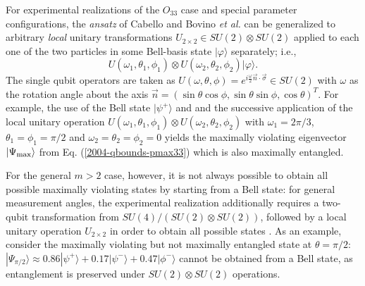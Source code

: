 \documentclass[pra,showpacs,showkeys,amsfonts,amsmath]{revtex4}
\begin{document}
For experimental realizations of the $O_{33}$ case and special parameter configurations,
the {\it ansatz} of Cabello \cite{cabello-2003a} and Bovino {\it et al.} \cite{bovino-2003}
can be generalized to arbitrary {\em local}
unitary transformations $U_{2\times 2} \in SU(2) \otimes SU(2)$ applied to each one of the two particles
in some Bell-basis state $|\varphi \rangle$
separately; i.e.,
\begin{equation}
  U(\omega_1,\theta_1,\phi_1)\otimes U(\omega_2,\theta_2,\phi_2) |\varphi \rangle .
\label{2004-qbounds-gencab}
\end{equation}
The single
qubit operators are taken as $U(\omega,\theta,\phi) =
e^{i\frac{\omega}{2} \vec{n}\cdot\vec{\sigma}} \in SU(2)$ with
$\omega$ as the rotation angle about the axis $\vec{n}=
(\sin\theta\cos\phi,\sin\theta\sin\phi,\cos\theta)^T$.
For example, the use of the Bell state
$|\psi^+ \rangle $ and
and the successive application of the local unitary operation $U(\omega_1,\theta_1,\phi_1)\otimes
U(\omega_2,\theta_2,\phi_2)$ with $\omega_1 =2\pi/3$,
$\theta_1=\phi_1=\pi/2$ and $\omega_2=\theta_2=\phi_2=0$ yields the  maximally violating eigenvector
$|\Psi_{\rm max }\rangle$ from
Eq. (\ref{2004-qbounds-pmax33}) which is also maximally entangled.

For the general $m>2$ case,  however,
it is not always possible to obtain all possible maximally violating states by starting from a Bell state:
for general measurement angles, the experimental realization additionally requires a two-qubit
transformation from
$SU(4)/(SU(2)\otimes SU(2))$, followed by a local
unitary operation $U_{2\times 2}$ in order to obtain all possible
states \cite{zhang-2003}.
As an example, consider the maximally violating but not maximally entangled state at $\theta=\pi/2$:
$|\Psi_{\pi/2} \rangle \approx 0.86
  |\psi^+ \rangle + 0.17|\psi^- \rangle + 0.47|\phi^- \rangle$ cannot be
  obtained from a Bell state, as
  entanglement is preserved under $SU(2) \otimes SU(2)$ operations.
\end{document}
